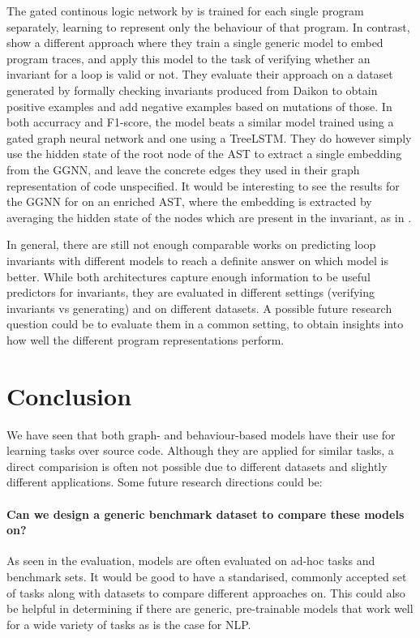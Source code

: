 \documentclass[sigconf,authordraft=true,nonacm=true]{acmart}
\begin{document}
The gated continous logic network by \citet{yao_learning_2020} is trained for each single program separately, learning to represent only the behaviour of that program.
In contrast, \citet{wang_learning_2019} show a different approach where they train a single generic model to embed program traces, and apply this model to the task of verifying whether an invariant for a loop is valid or not.
They evaluate their approach on a dataset generated by formally checking invariants produced from Daikon to obtain positive examples and add negative examples based on mutations of those.
In both accurracy and F1-score, the model beats a similar model trained using a gated graph neural network and one using a TreeLSTM.
They do however simply use the hidden state of the root node of the AST to extract a single embedding from the GGNN, and leave the concrete edges they used in their graph representation of code unspecified.
It would be interesting to see the results for the GGNN for on an enriched AST, where the embedding is extracted by averaging the hidden state of the nodes which are present in the invariant, as in \citet{hellendoorn_are_2019}.

In general, there are still not enough comparable works on predicting loop invariants with different models to reach a definite answer on which model is better.
While both architectures capture enough information to be useful predictors for invariants, they are evaluated in different settings (verifying invariants vs generating) and on different datasets.
A possible future research question could be to evaluate them in a common setting, to obtain insights into how well the different program representations perform.

\section{Conclusion}
We have seen that both graph- and behaviour-based models have their use for learning tasks over source code.
Although they are applied for similar tasks, a direct comparision is often not possible due to different datasets and slightly different applications.
Some future research directions could be:

\paragraph{Can we design a generic benchmark dataset to compare these models on?}
  As seen in the evaluation, models are often evaluated on ad-hoc tasks and benchmark sets.
  It would be good to have a standarised, commonly accepted set of tasks along with datasets to compare different approaches on.
  This could also be helpful in determining if there are generic, pre-trainable models that work well for a wide variety of tasks as is the case for NLP.
\end{document}
